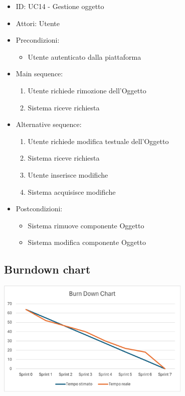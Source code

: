 \documentclass{article}
\begin{document}
\begin{itemize}[label = {-}]
    \itemsep0px
    \item ID: UC14 - Gestione oggetto
    \item Attori: Utente
    \item Precondizioni: 
        \begin{itemize}[label = {-}]
            \item Utente autenticato dalla piattaforma
        \end{itemize}
    \item Main sequence: 
        \begin{enumerate}
            \item Utente richiede rimozione dell'Oggetto
            \item Sistema riceve richiesta
        \end{enumerate}
    \item Alternative sequence:
        \begin{enumerate}
            \item Utente richiede modifica testuale dell'Oggetto
            \item Sistema riceve richiesta
            \item Utente inserisce modifiche
            \item Sistema acquisisce modifiche
        \end{enumerate}
    \item Postcondizioni: 
        \begin{itemize}[label = {-}]
            \item Sistema rimuove componente Oggetto
            \item Sistema modifica componente Oggetto
        \end{itemize}
\end{itemize}

\newpage
\subsection{Burndown chart}
\begin{center}
    \includegraphics[width=0.7\textwidth]{foto3.png}
\end{center}
\end{document}
